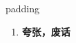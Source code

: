 
\begin{frame}
{\huge padding}
\begin{center}
\begin{enumerate}\Large
  \item \textbf{夸张，废话}
\end{enumerate}
\end{center}
\end{frame}

